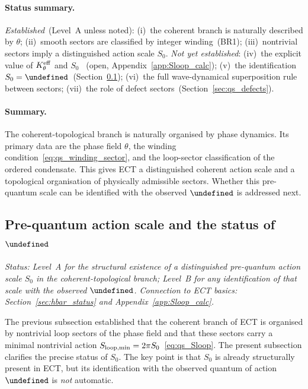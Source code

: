 \documentclass[11pt,a4paper]{article}
\let\hbar\undefined
\numberwithin{equation}{section}
\begin{document}
\paragraph{Status summary.}
\textit{Established}~(Level~A unless noted):
(i)~the coherent branch is naturally described by $\theta$;
(ii)~smooth sectors are classified by integer winding~(BR1);
(iii)~nontrivial sectors imply a distinguished action scale $S_0$.
\textit{Not yet established}:
(iv)~the explicit value of $K_\theta^{\rm eff}$ and $S_0$
~(open, Appendix~\ref{app:Sloop_calc});
(v)~the identification $S_0=\hbar$~(Section~\ref{sec:qs_hbar});
(vi)~the full wave-dynamical superposition rule between sectors;
(vii)~the role of defect sectors~(Section~\ref{sec:qs_defects}).

\paragraph{Summary.}
The coherent-topological branch is naturally organised by phase
dynamics.
Its primary data are the phase field $\theta$, the winding
condition~\eqref{eq:qs_winding_sector}, and the loop-sector
classification of the ordered condensate.
This gives ECT a distinguished coherent action scale and a topological
organisation of physically admissible sectors.
Whether this pre-quantum scale can be identified with the observed
$\hbar$ is addressed next.

\subsection{Pre-quantum action scale and the status of
  \texorpdfstring{$\hbar$}{hbar}}
\label{sec:qs_hbar}

\textit{Status: Level~A for the structural existence of a distinguished
pre-quantum action scale $S_0$ in the coherent-topological branch;
Level~B for any identification of that scale with the observed $\hbar$.
Connection to ECT basics: Section~\ref{sec:hbar_status} and
Appendix~\ref{app:Sloop_calc}.}

\medskip
The previous subsection established that the coherent branch of ECT
is organised by nontrivial loop sectors of the phase field and that
these sectors carry a minimal nontrivial action
$S_{\rm loop,min}=2\pi S_0$~\eqref{eq:qs_Sloop}.
The present subsection clarifies the precise status of $S_0$.
The key point is that $S_0$ is already structurally present in ECT,
but its identification with the observed quantum of action $\hbar$ is
\emph{not} automatic.
\end{document}
